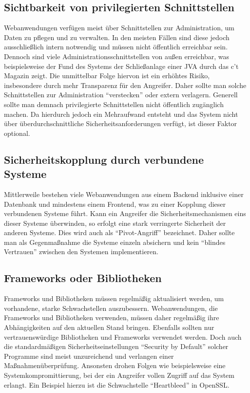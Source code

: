 \subsection{Sichtbarkeit von privilegierten Schnittstellen}
Webanwendungen verfügen meist über Schnittstellen zur Administration, um Daten zu pflegen und zu verwalten.
In den meisten Fällen sind diese jedoch ausschließlich intern notwendig und müssen nicht öffentlich erreichbar sein.
Dennoch sind viele Administrationsschnittstellen von außen erreichbar, was beispielsweise der Fund des Systems der Schließanlage einer JVA durch das c’t Magazin zeigt.
Die unmittelbar Folge hiervon ist ein erhöhtes Risiko, insbesondere durch mehr Transparenz für den Angreifer.
Daher sollte man solche Schnittstellen zur Administration \enquote{verstecken} oder extern verlagern.
Generell sollte man demnach privilegierte Schnittstellen nicht öffentlich zugänglich machen. Da hierdurch jedoch ein Mehraufwand entsteht und das System nicht über überdurchschnittliche Sicherheitsanforderungen verfügt, ist dieser Faktor optional.

\subsection{Sicherheitskopplung durch verbundene Systeme}
Mittlerweile bestehen viele Webanwendungen aus einem Backend inklusive einer Datenbank und mindestens einem Frontend, was zu einer Kopplung dieser verbundenen Systeme führt. Kann ein Angreifer die Sicherheitsmechanismen eins dieser Systeme überwinden, so erfolgt eine stark verringerte Sicherheit der anderen Systeme. Dies wird auch als \enquote{Pivot-Angriff} bezeichnet.
Daher sollte man als Gegenmaßnahme die Systeme einzeln absichern und kein \enquote{blindes Vertrauen} zwischen den Systemen implementieren.

\subsection{Frameworks oder Bibliotheken}
Frameworks und Bibliotheken müssen regelmäßig aktualisiert werden, um vorhandene, starke Schwachstellen auszubessern.
Webanwendungen, die Frameworks und Bibliotheken verwenden, müssen daher regelmäßig ihre Abhängigkeiten auf den aktuellen Stand bringen. Ebenfalls sollten nur vertrauenswürdige Bibliotheken und Frameworks verwendet werden. Doch auch die standardmäßigen Sicherheitseinstellungen \enquote{Security by Default} solcher Programme sind meist unzureichend und verlangen einer Maßnahmenüberprüfung.
Ansonsten drohen Folgen wie beispielsweise eine Systemkompromittierung, bei der ein Angreifer vollen Zugriff auf das System erlangt. 
Ein Beispiel hierzu ist die Schwachstelle \enquote{Heartbleed} in OpenSSL.

